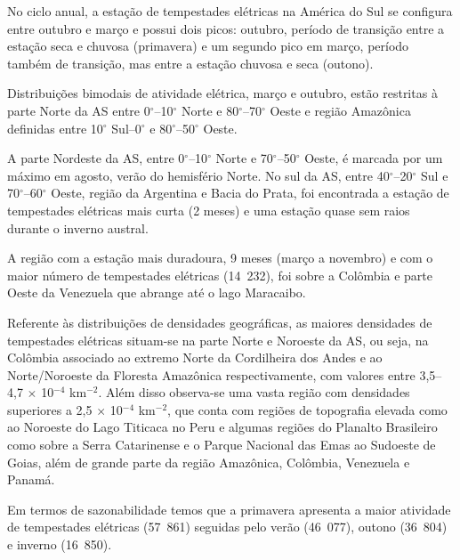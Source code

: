 
No ciclo anual, a estação de tempestades elétricas na América do Sul se configura entre outubro e março e possui dois picos:  outubro, período de transição entre a estação seca e chuvosa (primavera) e um segundo pico em março, período também de transição, mas entre a estação chuvosa e seca (outono).

Distribuições bimodais de atividade elétrica, março e outubro, estão restritas à parte Norte da AS entre 0$^{\circ}$--10$^{\circ}$ Norte e 80$^{\circ}$--70$^{\circ}$ Oeste e região Amazônica definidas entre 10$^{\circ}$ Sul--0$^{\circ}$ e 80$^{\circ}$--50$^{\circ}$ Oeste. 

A parte Nordeste da AS, entre 0$^{\circ}$--10$^{\circ}$ Norte e 70$^{\circ}$--50$^{\circ}$ Oeste, é marcada por um máximo em agosto, verão do hemisfério Norte. No sul da AS,  entre 40$^{\circ}$--20$^{\circ}$ Sul e 70$^{\circ}$--60$^{\circ}$ Oeste, região da Argentina e Bacia do Prata, foi encontrada a estação de tempestades elétricas mais curta (2 meses) e uma estação quase sem raios durante o inverno austral.

A região com a estação mais duradoura, 9 meses (março a novembro) e com o maior número de tempestades elétricas (14~232), foi sobre a Colômbia e parte Oeste da Venezuela que abrange até o lago Maracaibo.  



Referente às distribuições de densidades geográficas, as maiores densidades de tempestades elétricas situam-se na parte Norte e Noroeste da AS, ou seja, na Colômbia associado ao extremo Norte da Cordilheira dos Andes e ao Norte/Noroeste da Floresta Amazônica respectivamente, com valores entre 3,5--4,7 $\times$ 10$^{-4}$ km$^{-2}$. Além disso observa-se uma vasta região com densidades superiores a  2,5 $\times$ 10$^{-4}$ km$^{-2}$, que conta com regiões de topografia elevada como ao Noroeste do Lago Titicaca no Peru e algumas regiões do Planalto Brasileiro como sobre a Serra Catarinense e o Parque Nacional das Emas ao Sudoeste de Goias, além de grande parte da região Amazônica, Colômbia, Venezuela e Panamá.  

Em termos de sazonabilidade temos que a primavera apresenta a maior atividade de tempestades elétricas (57~861) seguidas pelo verão (46~077), outono (36~804) e inverno (16~850). 


